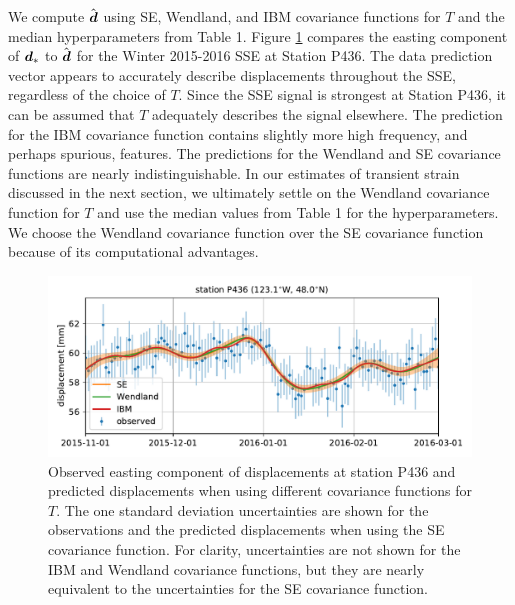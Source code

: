 \documentclass[extra,mreferee]{gji}
\begin{document}
We compute $\hat{\mitbf{d}}$ using SE, Wendland, and IBM covariance functions for $T$ and the median hyperparameters from Table 1. Figure \ref{fig:Fit} compares the easting component of $\mitbf{d}_*$ to $\hat{\mitbf{d}}$ for the Winter 2015-2016 SSE at Station P436. The data prediction vector appears to accurately describe displacements throughout the SSE, regardless of the choice of $T$. Since the SSE signal is strongest at Station P436, it can be assumed that $T$ adequately describes the signal elsewhere. The prediction for the IBM covariance function contains slightly more high frequency, and perhaps spurious, features. The predictions for the Wendland and SE covariance functions are nearly indistinguishable. In our estimates of transient strain discussed in the next section, we ultimately settle on the Wendland covariance function for $T$ and use the median values from Table 1 for the hyperparameters. We choose the Wendland covariance function over the SE covariance function because of its computational advantages.     

\begin{figure}
\includegraphics{figures/signal_fit/signal-fit.pdf}
\caption{Observed easting component of displacements at station P436 and predicted displacements when using different covariance functions for $T$. The one standard deviation uncertainties are shown for the observations and the predicted displacements when using the SE covariance function. For clarity, uncertainties are not shown for the IBM and Wendland covariance functions, but they are nearly equivalent to the uncertainties for the SE covariance function.}   
\label{fig:Fit}
\end{figure}
\end{document}
